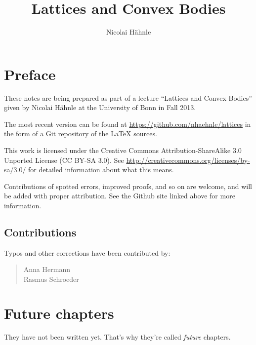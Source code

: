 \documentclass[a4paper,10pt]{scrbook}
\title{Lattices and Convex Bodies}
\author{Nicolai Hähnle}
\theoremstyle{plain}
\theoremstyle{definition}
\begin{document}
\maketitle

\tableofcontents

\chapter*{Preface}

These notes are being prepared as part of a lecture ``Lattices and Convex Bodies''
given by Nicolai Hähnle at the University of Bonn in Fall 2013.

The most recent version can be found at \url{https://github.com/nhaehnle/lattices}
in the form of a Git repository of the \LaTeX{} sources.

This work is licensed under the Creative Commons Attribution-ShareAlike 3.0
Unported License (CC BY-SA 3.0). See \url{http://creativecommons.org/licenses/by-sa/3.0/}
for detailed information about what this means.

Contributions of spotted errors, improved proofs, and so on are welcome,
and will be added with proper attribution.
See the Github site linked above for more information.


\section*{Contributions}

Typos and other corrections have been contributed by:
\begin{quote}
  Anna Hermann\\
  Rasmus Schroeder\\
\end{quote}










\chapter{Future chapters}
\label{chapter:not-yet}

They have not been written yet. That's why they're called \emph{future} chapters.





\end{document}

